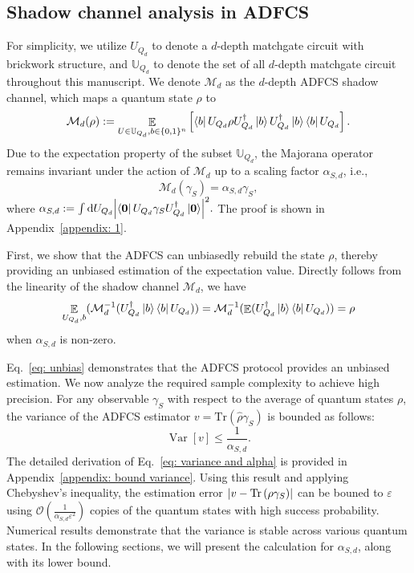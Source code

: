 \documentclass[showpacs,onecolumn,aps,prx,long bibliography,superscriptaddress,notitlepage]{revtex4-1}
\newcommand{\cbra}[1]{\{ #1 \}}
\newcommand{\tra}[1]{\text{Tr}\left( #1 \right)}
\newcommand{\mean}{\mathop{\mathbb{E}}}
\newcommand{\Var}{\mathop{\mathrm{Var}}}
\newcommand{\Mcal}{\mathcal{M}}
\newcommand{\Ubb}{\mathbb{U}}
\begin{document}
\subsection{Shadow channel analysis in ADFCS}
\label{sec: shadow channel}
For simplicity, we utilize $U_{Q_d}$ to denote a $d$-depth matchgate circuit with brickwork structure, and $\Ubb_{Q_d}$ to denote the set of all $d$-depth matchgate circuit throughout this manuscript. We denote $\Mcal_d$ as the $d$-depth ADFCS shadow channel, which maps a quantum state $\rho$ to
\begin{equation}
    \mathcal{M}_d(\rho) := \mathop{\mathbb{E}}\limits_{U\in\Ubb_{Q_d},b\in\cbra{0,1}^n} \left[ \bra{b}U_{Q_d} 
  \rho U_{Q_d}^\dagger \ket{b}  U_{Q_d}^\dagger \ket{b} \bra{b}U_{Q_d}\right].
\end{equation}
Due to the expectation property of the subset $\Ubb_{Q_d}$, the Majorana operator remains invariant under the action of $\Mcal_{d}$ up to a scaling factor $\alpha_{S,d}$, i.e.,
\begin{equation}
\mathcal{M}_d(\gamma_S) = \alpha_{S,d} \gamma_S,
\label{eq: lemma1 eigen}
\end{equation}
where
$\alpha_{S,d} := \int \dd U_{Q_d} \abs{\bra{\bm 0}U_{Q_d} \gamma_S U_{Q_d}^\dagger\ket{\bm 0}}^2.$
The proof is shown in Appendix~\ref{appendix: 1}. 


First, we show that the ADFCS can unbiasedly rebuild the state $\rho$, thereby providing an unbiased estimation of the expectation value. Directly follows from the linearity of the shadow channel $\mathcal{M}_d$, we have
\begin{equation}
    \mathop{\mathbb{E}}\limits_{U_{Q_d}, b } ( \mathcal{M}^{-1}_{d}(U_{Q_d}^\dagger \ket{b} \bra{b}U_{Q_d})) = \mathcal{M}^{-1}_{d}(\mean(U_{Q_d}^\dagger \ket{b} \bra{b}U_{Q_d}) ) = \rho
    \label{eq: unbias}
\end{equation}
when $\alpha_{S,d}$ is non-zero. 




Eq.~\eqref{eq: unbias} demonstrates that the ADFCS protocol provides an unbiased estimation. We now analyze the required sample complexity to achieve high precision.  
For any observable $\gamma_S$ with respect to the average of quantum states $\rho$, the variance of the ADFCS estimator $v = \tra{\hat{\rho} \gamma_S}$ is bounded as follows:
\begin{equation}
\Var[v] \leq \frac{1}{\alpha_{S,d}}.
\label{eq: variance and alpha}
\end{equation}
The detailed derivation of Eq.~\eqref{eq: variance and alpha} is provided in Appendix~\ref{appendix: bound variance}. Using this result and applying Chebyshev's inequality, the estimation error $\abs{v - \tra{\rho \gamma_S}}$ can be bouned to $\varepsilon$ using $\mathcal{O}(\frac{1}{\alpha_{S,d}\varepsilon^2})$ copies of the quantum states with high success probability. Numerical results demonstrate that the variance is stable across various quantum states. In the following sections, we will present the calculation for $\alpha_{S,d}$, along with its {lower bound.}  
\end{document}
